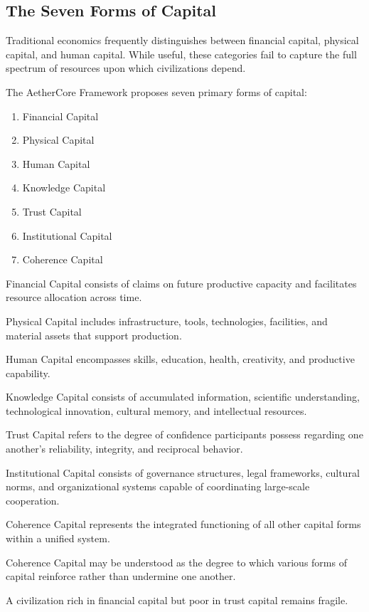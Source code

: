 \documentclass[12pt]{article}
\begin{document}
\subsection{The Seven Forms of Capital}

Traditional economics frequently distinguishes between financial capital, physical capital, and human capital. While useful, these categories fail to capture the full spectrum of resources upon which civilizations depend.

The AetherCore Framework proposes seven primary forms of capital:

\begin{enumerate}
  \item Financial Capital
  \item Physical Capital
  \item Human Capital
  \item Knowledge Capital
  \item Trust Capital
  \item Institutional Capital
  \item Coherence Capital
\end{enumerate}

Financial Capital consists of claims on future productive capacity and facilitates resource allocation across time.

Physical Capital includes infrastructure, tools, technologies, facilities, and material assets that support production.

Human Capital encompasses skills, education, health, creativity, and productive capability.

Knowledge Capital consists of accumulated information, scientific understanding, technological innovation, cultural memory, and intellectual resources.

Trust Capital refers to the degree of confidence participants possess regarding one another's reliability, integrity, and reciprocal behavior.

Institutional Capital consists of governance structures, legal frameworks, cultural norms, and organizational systems capable of coordinating large-scale cooperation.

Coherence Capital represents the integrated functioning of all other capital forms within a unified system.

Coherence Capital may be understood as the degree to which various forms of capital reinforce rather than undermine one another.

A civilization rich in financial capital but poor in trust capital remains fragile.
\end{document}
